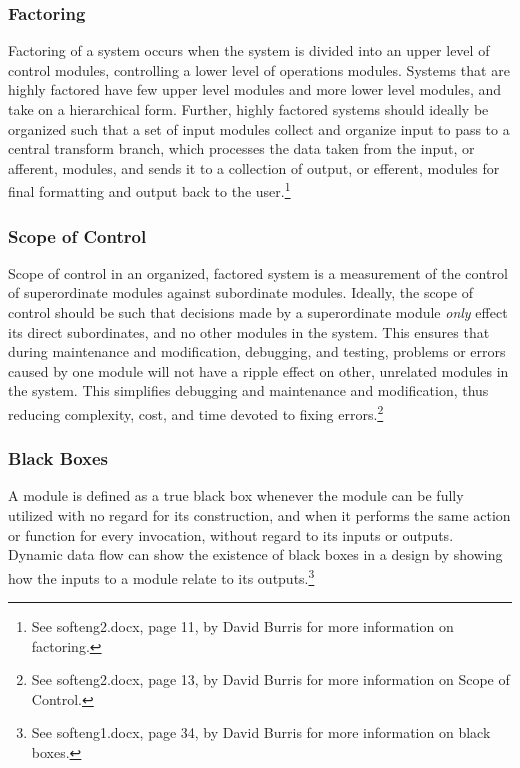 \documentclass{article}
\begin{document}
		\subsubsection{Factoring}
			Factoring of a system occurs when the system is divided into an upper level of control modules, controlling a lower level of operations modules. Systems that are highly factored have few upper level modules and more lower level modules, and take on a hierarchical form. Further, highly factored systems should ideally be organized such that a set of input modules collect and organize input to pass to a central transform branch, which processes the data taken from the input, or afferent, modules, and sends it to a collection of output, or efferent, modules for final formatting and output back to the user.\footnote{See softeng2.docx, page 11, by David Burris for more information on factoring.} 
		\subsubsection{Scope of Control}
			Scope of control in an organized, factored system is a measurement of the control of superordinate modules against subordinate modules. Ideally, the scope of control should be such that decisions made by a superordinate module \emph{only} effect its direct subordinates, and no other modules in the system. This ensures that during maintenance and modification, debugging, and testing, problems or errors caused by one module will not have a ripple effect on other, unrelated modules in the system. This simplifies debugging and maintenance and modification, thus reducing complexity, cost, and time devoted to fixing errors.\footnote{See softeng2.docx, page 13, by David Burris for more information on Scope of Control.}  
		\subsubsection{Black Boxes}
			A module is defined as a true black box whenever the module can be fully utilized with no regard for its construction, and when it performs the same action or function for every invocation, without regard to its inputs or outputs. Dynamic data flow can show the existence of black boxes in a design by showing how the inputs to a module relate to its outputs.\footnote{See softeng1.docx, page 34, by David Burris for more information on black boxes.} 
\end{document}
